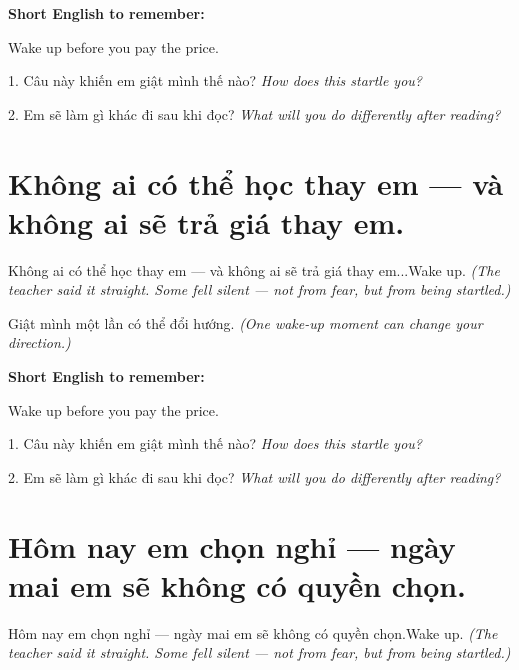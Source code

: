 \begin{ghinhoanh}
\textbf{Short English to remember:}

Wake up before you pay the price.

\end{ghinhoanh}

\begin{tuhocnhanh}
1. Câu này khiến em giật mình thế nào? \textit{How does this startle you?}

2. Em sẽ làm gì khác đi sau khi đọc? \textit{What will you do differently after reading?}
\end{tuhocnhanh}
\ngancach


\section{Không ai có thể học thay em — và không ai sẽ trả giá thay em.}
\begin{truyen}{Không ai có thể học thay em — và không ai sẽ trả giá thay em...}{Wake up.}
\textit{(The teacher said it straight. Some fell silent — not from fear, but from being startled.)}
\end{truyen}

\begin{baihoc}
Giật mình một lần có thể đổi hướng.
\textit{(One wake-up moment can change your direction.)}
\end{baihoc}

\begin{ghinhoanh}
\textbf{Short English to remember:}

Wake up before you pay the price.

\end{ghinhoanh}

\begin{tuhocnhanh}
1. Câu này khiến em giật mình thế nào? \textit{How does this startle you?}

2. Em sẽ làm gì khác đi sau khi đọc? \textit{What will you do differently after reading?}
\end{tuhocnhanh}
\ngancach


\section{Hôm nay em chọn nghỉ — ngày mai em sẽ không có quyền chọn.}
\begin{truyen}{Hôm nay em chọn nghỉ — ngày mai em sẽ không có quyền chọn.}{Wake up.}
\textit{(The teacher said it straight. Some fell silent — not from fear, but from being startled.)}
\end{truyen}

